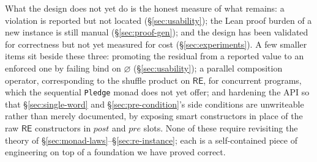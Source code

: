\documentclass[acmsmall,screen]{acmart}
\newcommand{\RE}{\mathsf{RE}}
\newcommand{\pre}{\mathit{pre}}
\newcommand{\post}{\mathit{post}}
\begin{document}
What the design does not yet do is the honest measure of what remains:
a violation is reported but not located
(\S\ref{sec:usability}); the Lean proof burden of a new instance is still
manual (\S\ref{sec:proof-gen}); and the design has been validated for
correctness but not yet measured for cost (\S\ref{sec:experiments}).
A few smaller items sit beside these three: promoting the residual from a
reported value to an enforced one by failing bind on $\varnothing$
(\S\ref{sec:usability}); a parallel composition operator, corresponding to
the shuffle product on $\RE$, for concurrent programs, which the
sequential \lstinline{Pledge} monad does not yet offer; and hardening the
API so that \S\ref{sec:single-word} and \S\ref{sec:pre-condition}'s side
conditions are unwriteable rather than merely documented, by exposing
smart constructors in place of the raw $\RE$ constructors in $\post$ and
$\pre$ slots.
None of these require revisiting the theory of \S\ref{sec:monad-laws}--\S\ref{sec:re-instance};
each is a self-contained piece of engineering on top of a foundation we
have proved correct.



\end{document}
